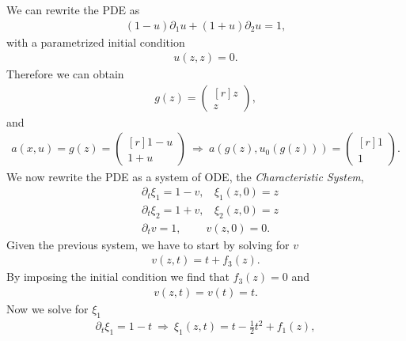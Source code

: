 \begin{questions}

\begin{solution}
We can rewrite the PDE as
\begin{align*}
(1-u)\partial_1u+(1+u)\partial_2u=1,
\end{align*}
with a parametrized initial condition 
\begin{align*}
u(z,z)=0.
\end{align*}
Therefore we can obtain
\begin{align*}
g(z)=\begin{pmatrix*}[r]
z\\
z
\end{pmatrix*},
\end{align*}
and
\begin{align*}
a(x,u)=g(z)=\begin{pmatrix*}[r]
1-u\\
1+u
\end{pmatrix*}~\Rightarrow~
a(g(z),u_0(g(z)))=\begin{pmatrix*}[r]
1\\
1
\end{pmatrix*}.
\end{align*}
We now rewrite the PDE as a system of ODE, the \textit{Characteristic System},
\begin{align*}
&\partial_t\xi_1=1-v,~~~~\xi_1(z,0)=z\\
&\partial_t\xi_2=1+v,~~~~\xi_2(z,0)=z\\
&\partial_tv=1,~~~~~~~~~~v(z,0)=0.\end{align*}
Given the previous system, we have to start by solving for $v$
\begin{align*}
v(z,t)=t+f_3(z).
\end{align*}
By imposing the initial condition we find that $f_3(z)=0$ and
\begin{align*}
v(z,t)=v(t)=t.
\end{align*}
Now we solve for $\xi_1$
\begin{align*}
\partial_t\xi_1=1-t~\Rightarrow~\xi_1(z,t)=t-\frac{1}{2}t^2+f_1(z),
\end{align*}

\end{solution}
\end{questions}
